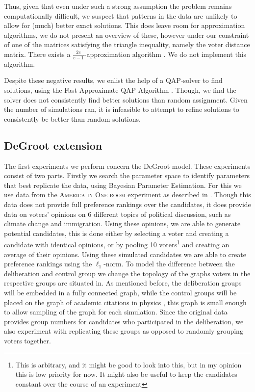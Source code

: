 Thus, given that even under such a strong assumption the problem remains
computationally difficult, we suspect that patterns in the data are unlikely
to allow for (much) better exact solutions. This does leave room for
approximation algorithms, we do not present an overview of these, however under
our constraint of one of the matrices satisfying the triangle inequality,
namely the voter distance matrix. There exists a $\frac{2e}{e-1}$-approximation
algorithm \cite{nagarajanMaximumQuadraticAssignment}. We do not implement this algorithm.

Despite these negative results, we enlist
the help of a QAP-solver \cite{virtanenSciPy10Fundamental2020}  to find
solutions, using the Fast Approximate QAP Algorithm
\cite{vogelsteinFastApproximateQuadratic2015}. Though, we find the solver does not
consistently find better solutions than random assignment. Given the number of
simulations ran, it is infeasible to attempt to refine solutions to consistently
be better than random solutions.


\subsection{DeGroot extension}

The first experiments we perform concern the DeGroot model. These experiments
consist of two parts. Firstly we search the parameter space to identify
parameters that best replicate the data, using Bayesian Parameter Estimation.
For this we use data from the \textsc{America in One room} experiment as
described in . Though this data does not provide
full preference rankings over the candidates, it does provide data on voters'
opinions on 6 different topics of political discussion, such as climate change
and immigration. Using these opinions, we are able to generate potential
candidates, this is done either by selecting a voter and creating a candidate
with identical opinions, or by pooling 10 voters\footnote{This is arbitrary,
	and it might be good to look into this, but in my opinion this is low priority
	for now. It might also be useful to keep the candidates constant over the
	course of an experiment}
and creating an average of their opinions. Using these
simulated candidates we are able to create preference rankings using the
$\ell_1$-norm. To model the difference between the deliberation and control
group we change the topology of the graphs voters in the respective groups are
situated in. As mentioned before, the deliberation groups will be embedded in a fully connected
graph, while the control groups will be placed on the graph of academic
citations in physics \cite{nr}, this graph is small enough to
allow sampling of the graph for each simulation. Since the original data
provides group numbers for candidates who participated in the deliberation, we
also experiment with replicating these groups as opposed to randomly grouping
voters together.


